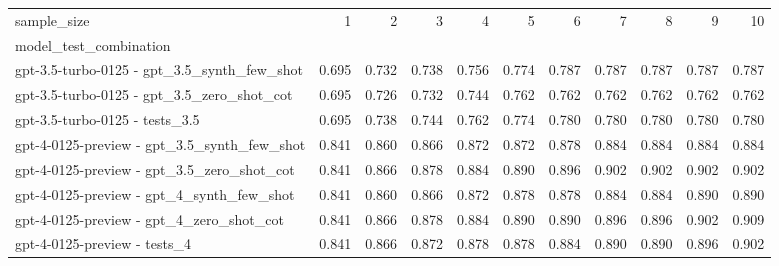 \begin{tabular}{lrrrrrrrrrr}
\toprule
sample_size & 1 & 2 & 3 & 4 & 5 & 6 & 7 & 8 & 9 & 10 \\
model_test_combination &  &  &  &  &  &  &  &  &  &  \\
\midrule
gpt-3.5-turbo-0125 - gpt_3.5_synth_few_shot & 0.695 & 0.732 & 0.738 & 0.756 & 0.774 & 0.787 & 0.787 & 0.787 & 0.787 & 0.787 \\
gpt-3.5-turbo-0125 - gpt_3.5_zero_shot_cot & 0.695 & 0.726 & 0.732 & 0.744 & 0.762 & 0.762 & 0.762 & 0.762 & 0.762 & 0.762 \\
gpt-3.5-turbo-0125 - tests_3.5 & 0.695 & 0.738 & 0.744 & 0.762 & 0.774 & 0.780 & 0.780 & 0.780 & 0.780 & 0.780 \\
gpt-4-0125-preview - gpt_3.5_synth_few_shot & 0.841 & 0.860 & 0.866 & 0.872 & 0.872 & 0.878 & 0.884 & 0.884 & 0.884 & 0.884 \\
gpt-4-0125-preview - gpt_3.5_zero_shot_cot & 0.841 & 0.866 & 0.878 & 0.884 & 0.890 & 0.896 & 0.902 & 0.902 & 0.902 & 0.902 \\
gpt-4-0125-preview - gpt_4_synth_few_shot & 0.841 & 0.860 & 0.866 & 0.872 & 0.878 & 0.878 & 0.884 & 0.884 & 0.890 & 0.890 \\
gpt-4-0125-preview - gpt_4_zero_shot_cot & 0.841 & 0.866 & 0.878 & 0.884 & 0.890 & 0.890 & 0.896 & 0.896 & 0.902 & 0.909 \\
gpt-4-0125-preview - tests_4 & 0.841 & 0.866 & 0.872 & 0.878 & 0.878 & 0.884 & 0.890 & 0.890 & 0.896 & 0.902 \\
\bottomrule
\end{tabular}
